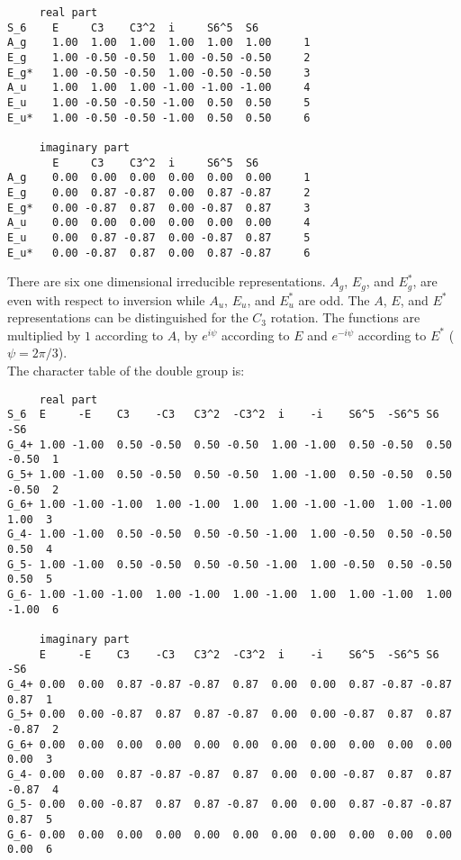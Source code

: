 \documentclass[12pt,a4paper,twoside]{report}
\begin{document}
\begin{tcolorbox}
\begin{footnotesize}
\begin{verbatim}
     real part
S_6    E     C3    C3^2  i     S6^5  S6   
A_g    1.00  1.00  1.00  1.00  1.00  1.00     1
E_g    1.00 -0.50 -0.50  1.00 -0.50 -0.50     2
E_g*   1.00 -0.50 -0.50  1.00 -0.50 -0.50     3
A_u    1.00  1.00  1.00 -1.00 -1.00 -1.00     4
E_u    1.00 -0.50 -0.50 -1.00  0.50  0.50     5
E_u*   1.00 -0.50 -0.50 -1.00  0.50  0.50     6

     imaginary part
       E     C3    C3^2  i     S6^5  S6   
A_g    0.00  0.00  0.00  0.00  0.00  0.00     1
E_g    0.00  0.87 -0.87  0.00  0.87 -0.87     2
E_g*   0.00 -0.87  0.87  0.00 -0.87  0.87     3
A_u    0.00  0.00  0.00  0.00  0.00  0.00     4
E_u    0.00  0.87 -0.87  0.00 -0.87  0.87     5
E_u*   0.00 -0.87  0.87  0.00  0.87 -0.87     6
\end{verbatim}
\end{footnotesize}
\end{tcolorbox}

There are six one dimensional irreducible representations. $A_g$, $E_g$,
and $E_g^*$, are even with respect to inversion while $A_u$, $E_u$, and $E_u^*$
are odd. The $A$, $E$, and $E^*$ representations can be distinguished 
for the $C_3$ rotation. The functions are multiplied by $1$ according to $A$,
by $e^{i\psi}$ according to $E$ and $e^{-i\psi}$ according to $E^*$
($\psi=2\pi/3$). \\
The character table of the double group is:

\begin{tcolorbox}
\begin{scriptsize}
\begin{verbatim}
     real part
S_6  E     -E    C3    -C3   C3^2  -C3^2  i    -i    S6^5  -S6^5 S6    -S6  
G_4+ 1.00 -1.00  0.50 -0.50  0.50 -0.50  1.00 -1.00  0.50 -0.50  0.50 -0.50  1
G_5+ 1.00 -1.00  0.50 -0.50  0.50 -0.50  1.00 -1.00  0.50 -0.50  0.50 -0.50  2
G_6+ 1.00 -1.00 -1.00  1.00 -1.00  1.00  1.00 -1.00 -1.00  1.00 -1.00  1.00  3
G_4- 1.00 -1.00  0.50 -0.50  0.50 -0.50 -1.00  1.00 -0.50  0.50 -0.50  0.50  4
G_5- 1.00 -1.00  0.50 -0.50  0.50 -0.50 -1.00  1.00 -0.50  0.50 -0.50  0.50  5
G_6- 1.00 -1.00 -1.00  1.00 -1.00  1.00 -1.00  1.00  1.00 -1.00  1.00 -1.00  6

     imaginary part
     E     -E    C3    -C3   C3^2  -C3^2  i    -i    S6^5  -S6^5 S6    -S6  
G_4+ 0.00  0.00  0.87 -0.87 -0.87  0.87  0.00  0.00  0.87 -0.87 -0.87  0.87  1 
G_5+ 0.00  0.00 -0.87  0.87  0.87 -0.87  0.00  0.00 -0.87  0.87  0.87 -0.87  2
G_6+ 0.00  0.00  0.00  0.00  0.00  0.00  0.00  0.00  0.00  0.00  0.00  0.00  3
G_4- 0.00  0.00  0.87 -0.87 -0.87  0.87  0.00  0.00 -0.87  0.87  0.87 -0.87  4
G_5- 0.00  0.00 -0.87  0.87  0.87 -0.87  0.00  0.00  0.87 -0.87 -0.87  0.87  5
G_6- 0.00  0.00  0.00  0.00  0.00  0.00  0.00  0.00  0.00  0.00  0.00  0.00  6
\end{verbatim}
\end{scriptsize}
\end{tcolorbox}
\end{document}
